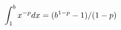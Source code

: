 \documentclass[preview]{standalone}
\begin{document}
\begin{align*}
\special{dvisvgm:raw <g id='unique000'>}\int_1^b x^{-p}dx=(b^{1-p}-1)/(1-p)\special{dvisvgm:raw </g>}
\end{align*}
\end{document}

